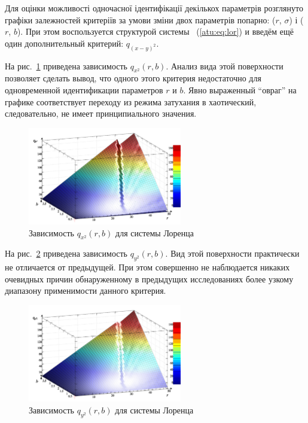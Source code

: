 Для оцінки можливості одночасної ідентифікації декількох параметрів
розглянуто графіки залежностей критеріїв за умови зміни двох параметрів
попарно: ($r$, $\sigma$) і ($r$, $b$).
%
При этом воспользуется структурой системы ~(\ref{atu:eq:lor})
и введём ещё один дополнительный критерий: $q_{(x-y)^2}$.

На рис.~\ref{atu:f:lor_qx2_r_b} приведена зависимость
$q_{x^2}(r,b)$.
Анализ вида этой поверхности позволяет сделать вывод,
что одного этого критерия недостаточно для
одновременной идентификации параметров $r$ и $b$.
Явно выраженный ``овраг'' на графике соответствует
переходу из режима затухания в хаотический,
следовательно, не имеет принципиального значения.

\begin{figure}[ht!]
  \centerline{  \includegraphics[width=0.60\textwidth]{p/cha/lor/q2d/lor_qx2_r_b.png}  }
  \caption{Зависимость $q_{x^2}(r,b)$ для системы Лоренца}
  \label{atu:f:lor_qx2_r_b}
\end{figure}


На рис.~\ref{atu:f:lor_qy2_r_b} приведена зависимость
$q_{y^2}(r,b)$. Вид этой поверхности практически не отличается от предыдущей.
При этом совершенно не наблюдается никаких очевидных причин обнаруженному
в предыдущих исследованиях
более узкому диапазону применимости данного критерия.

\begin{figure}[ht!]
  \centerline{  \includegraphics[width=0.60\textwidth]{p/cha/lor/q2d/lor_qy2_r_b.png}  }
  \caption{Зависимость $q_{y^2}(r,b)$ для системы Лоренца}
  \label{atu:f:lor_qy2_r_b}
\end{figure}

